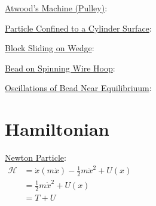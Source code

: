\documentclass[12pt]{article}
\begin{document}
\vspace{10pt}\noindent
\underline{Atwood's Machine (Pulley)}:

\vspace{20pt}\noindent
\underline{Particle Confined to a Cylinder Surface}:

\vspace{20pt}\noindent
\underline{Block Sliding on Wedge}:

\vspace{20pt}\noindent
\underline{Bead on Spinning Wire Hoop}:

\vspace{20pt}\noindent
\underline{Oscillations of Bead Near Equilibriuum}:

\newpage
\section{Hamiltonian}
\hspace{3cm}
\begin{minipage}[t]{8cm}
    \underline{Newton Particle}:\\[10pt]
    \(\begin{aligned}
        \mathcal{H} &= \dot{x} ( m \dot{x} ) - \tfrac{1}{2} m \dot{x}^2 + U(x) \\[5pt]
        &= \tfrac{1}{2} m \dot{x}^2 + U(x)\\[5pt]
        &= T + U
    \end{aligned}\)    
\end{minipage}
\end{document}
